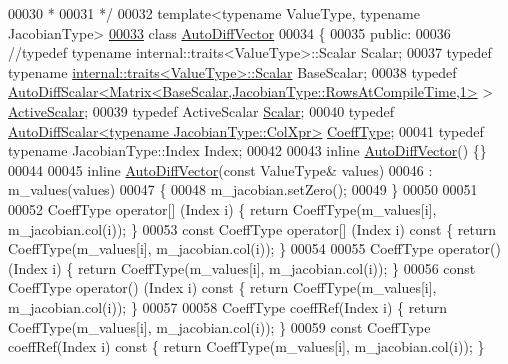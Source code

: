 \begin{DoxyCode}
00030 \textcolor{comment}{  *}
00031 \textcolor{comment}{  */}
00032 \textcolor{keyword}{template}<\textcolor{keyword}{typename} ValueType, \textcolor{keyword}{typename} JacobianType>
\hyperlink{class_eigen_1_1_auto_diff_vector}{00033} \textcolor{keyword}{class }\hyperlink{class_eigen_1_1_auto_diff_vector}{AutoDiffVector}
00034 \{
00035   \textcolor{keyword}{public}:
00036     \textcolor{comment}{//typedef typename internal::traits<ValueType>::Scalar Scalar;}
00037     \textcolor{keyword}{typedef} \textcolor{keyword}{typename} \hyperlink{struct_eigen_1_1internal_1_1traits}{internal::traits<ValueType>::Scalar} BaseScalar;
00038     \textcolor{keyword}{typedef} \hyperlink{class_eigen_1_1_auto_diff_scalar}{AutoDiffScalar<Matrix<BaseScalar,JacobianType::RowsAtCompileTime,1>}
       > \hyperlink{class_eigen_1_1_auto_diff_scalar}{ActiveScalar};
00039     \textcolor{keyword}{typedef} ActiveScalar \hyperlink{class_eigen_1_1_auto_diff_scalar}{Scalar};
00040     \textcolor{keyword}{typedef} \hyperlink{class_eigen_1_1_auto_diff_scalar}{AutoDiffScalar<typename JacobianType::ColXpr>} 
      \hyperlink{class_eigen_1_1_auto_diff_scalar}{CoeffType};
00041     \textcolor{keyword}{typedef} \textcolor{keyword}{typename} JacobianType::Index Index;
00042 
00043     \textcolor{keyword}{inline} \hyperlink{class_eigen_1_1_auto_diff_vector}{AutoDiffVector}() \{\}
00044 
00045     \textcolor{keyword}{inline} \hyperlink{class_eigen_1_1_auto_diff_vector}{AutoDiffVector}(\textcolor{keyword}{const} ValueType& values)
00046       : m\_values(values)
00047     \{
00048       m\_jacobian.setZero();
00049     \}
00050 
00051 
00052     CoeffType operator[] (Index i) \{ \textcolor{keywordflow}{return} CoeffType(m\_values[i], m\_jacobian.col(i)); \}
00053     \textcolor{keyword}{const} CoeffType operator[] (Index i)\textcolor{keyword}{ const }\{ \textcolor{keywordflow}{return} CoeffType(m\_values[i], m\_jacobian.col(i)); \}
00054 
00055     CoeffType operator() (Index i) \{ \textcolor{keywordflow}{return} CoeffType(m\_values[i], m\_jacobian.col(i)); \}
00056     \textcolor{keyword}{const} CoeffType operator() (Index i)\textcolor{keyword}{ const }\{ \textcolor{keywordflow}{return} CoeffType(m\_values[i], m\_jacobian.col(i)); \}
00057 
00058     CoeffType coeffRef(Index i) \{ \textcolor{keywordflow}{return} CoeffType(m\_values[i], m\_jacobian.col(i)); \}
00059     \textcolor{keyword}{const} CoeffType coeffRef(Index i)\textcolor{keyword}{ const }\{ \textcolor{keywordflow}{return} CoeffType(m\_values[i], m\_jacobian.col(i)); \}

\end{DoxyCode}
